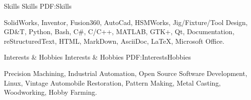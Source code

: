 \documentclass[
letterpaper,
MMMyyyy,
nonstopmode,
draftmode,
]{resume}
\begin{document}
\begin{Body}
\Section
{Skills}
{Skills}
{PDF:Skills}

\Entry
SolidWorks, Inventor, Fusion360, AutoCad, HSMWorks,
Jig/Fixture/Tool Design, GD\&T,
Python, Bash, C\#, C/C++, MATLAB, GTK+, Qt,
Documentation, reStructuredText, HTML, MarkDown, AsciiDoc, \LaTeX,
Microsoft Office.



\Section
{Interests \& Hobbies}
{Interests \& Hobbies}
{PDF:InterestsHobbies}

\Entry
Precision Machining,
Industrial Automation,
Open Source Software Development,
Linux,
Vintage Automobile Restoration,
Pattern Making, Metal Casting,
Woodworking, Hobby Farming.

\end{Body}
\end{document}
